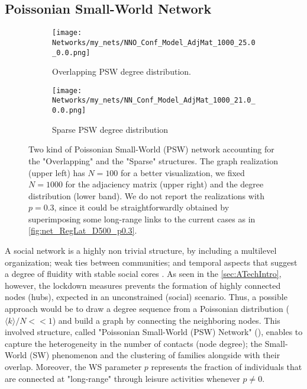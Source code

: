 \documentclass[a4paper,10pt, oneside]{book} %
\theoremstyle{definition}
\begin{document}
\clearpage
\subsection{Poissonian Small-World Network}
\label{sec:PSW_network}
\begin{figure}[ht]
    \begin{subfigure}{.45\linewidth}
        \texttt{[image: Networks/my\_nets/NNO\_Conf\_Model\_AdjMat\_1000\_25.0\_0.0.png]}
        \centering
        \caption{Overlapping PSW degree distribution. }
        \label{fig:netmod_O-PSW}
    \end{subfigure}
	\hfill
	\begin{subfigure}{.45\linewidth}
        \texttt{[image: Networks/my\_nets/NN\_Conf\_Model\_AdjMat\_1000\_21.0\_0.0.png]}
        \centering
        \caption{Sparse PSW degree distribution}
        \label{fig:netmod_S-PSW}
    \end{subfigure}
	\caption{Two kind of Poissonian Small-World (PSW) network accounting for the "Overlapping" and the "Sparse" structures. The graph realization (upper left) has $ N = 100$ for a better visualization, we fixed $ N = 1000$ for the adjaciency matrix (upper right) and the degree distribution (lower band). We do not report the realizations with $p = 0.3$, since it could be straightforwardly obtained by superimposing some long-range links to the current cases as in \autoref{fig:net_RegLat_D500_p0.3}.}
\end{figure}
A social network is a highly non trivial structure, by including a multilevel organization; weak ties between communities; and temporal aspects that suggest a degree of fluidity with stable social cores \cite{Thurner::NetBasedExpl}.
As seen in the \autoref{sec:ATechIntro}, however, the lockdown measures prevents the formation of highly connected nodes (hubs), expected in an unconstrained (social) scenario. Thus, a possible approach would be to draw a degree sequence from a Poissonian distribution ($\langle k \rangle / N <<1$) and build a graph by connecting the neighboring nodes.
This involved structure, called "Poissonian Small-World (PSW) Network" (\cite{Thurner::NetBasedExpl}), enables to capture the heterogeneity in the number of contacts (node degree); the Small-World (SW) phenomenon and the clustering of families alongside with their overlap. Moreover, the WS parameter $p$ represents the fraction of individuals that are connected at "long-range" through leisure activities whenever $ p \neq 0$. 
\end{document}
